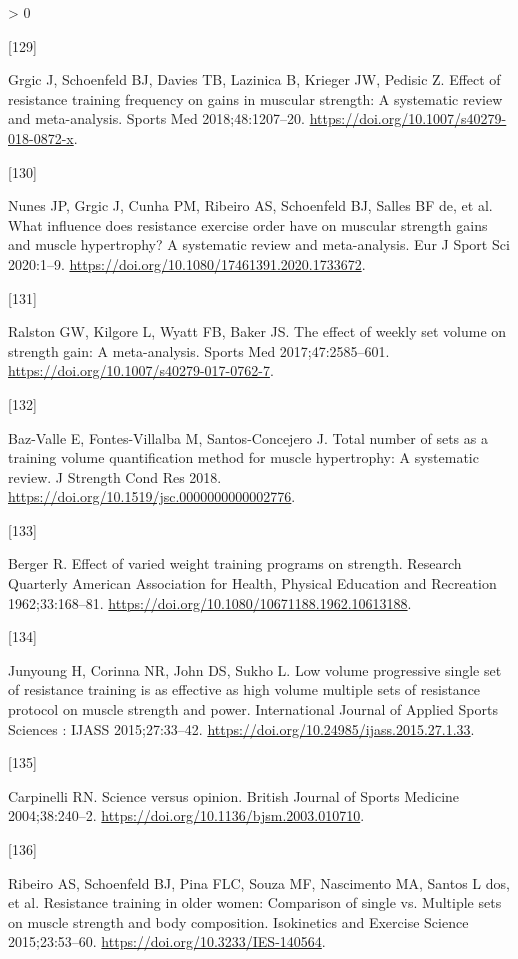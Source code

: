 \documentclass[twoside,10pt]{gihclass} %
\newlength{\cslhangindent}
\newlength{\csllabelwidth}
\newenvironment{CSLReferences}[3] %
 {%
  \setlength{\parindent}{0pt}
  \ifodd #1 \everypar{\setlength{\hangindent}{\cslhangindent}}\ignorespaces\fi
  \ifnum #2 > 0
  \setlength{\parskip}{#2\baselineskip}
  \fi
 }%
 {}
\newcommand{\CSLLeftMargin}[1]{\parbox[t]{\maxof{\widthof{#1}}{\csllabelwidth}}{#1}}
\newcommand{\CSLRightInline}[1]{\parbox[t]{\linewidth}{#1}}
\begin{document}
\begin{CSLReferences}{0}{0}
\leavevmode\hypertarget{ref-RN2570}{}%
\CSLLeftMargin{{[}129{]} }
\CSLRightInline{Grgic J, Schoenfeld BJ, Davies TB, Lazinica B, Krieger JW, Pedisic Z. Effect of resistance training frequency on gains in muscular strength: A systematic review and meta-analysis. Sports Med 2018;48:1207--20. \url{https://doi.org/10.1007/s40279-018-0872-x}.}

\leavevmode\hypertarget{ref-RN2591}{}%
\CSLLeftMargin{{[}130{]} }
\CSLRightInline{Nunes JP, Grgic J, Cunha PM, Ribeiro AS, Schoenfeld BJ, Salles BF de, et al. What influence does resistance exercise order have on muscular strength gains and muscle hypertrophy? A systematic review and meta-analysis. Eur J Sport Sci 2020:1--9. \url{https://doi.org/10.1080/17461391.2020.1733672}.}

\leavevmode\hypertarget{ref-RN2492}{}%
\CSLLeftMargin{{[}131{]} }
\CSLRightInline{Ralston GW, Kilgore L, Wyatt FB, Baker JS. The effect of weekly set volume on strength gain: A meta-analysis. Sports Med 2017;47:2585--601. \url{https://doi.org/10.1007/s40279-017-0762-7}.}

\leavevmode\hypertarget{ref-RN2130}{}%
\CSLLeftMargin{{[}132{]} }
\CSLRightInline{Baz-Valle E, Fontes-Villalba M, Santos-Concejero J. Total number of sets as a training volume quantification method for muscle hypertrophy: A systematic review. J Strength Cond Res 2018. \url{https://doi.org/10.1519/jsc.0000000000002776}.}

\leavevmode\hypertarget{ref-RN1476}{}%
\CSLLeftMargin{{[}133{]} }
\CSLRightInline{Berger R. Effect of varied weight training programs on strength. Research Quarterly American Association for Health, Physical Education and Recreation 1962;33:168--81. \url{https://doi.org/10.1080/10671188.1962.10613188}.}

\leavevmode\hypertarget{ref-RN2568}{}%
\CSLLeftMargin{{[}134{]} }
\CSLRightInline{Junyoung H, Corinna NR, John DS, Sukho L. Low volume progressive single set of resistance training is as effective as high volume multiple sets of resistance protocol on muscle strength and power. International Journal of Applied Sports Sciences : IJASS 2015;27:33--42. \url{https://doi.org/10.24985/ijass.2015.27.1.33}.}

\leavevmode\hypertarget{ref-RN2201}{}%
\CSLLeftMargin{{[}135{]} }
\CSLRightInline{Carpinelli RN. Science versus opinion. British Journal of Sports Medicine 2004;38:240--2. \url{https://doi.org/10.1136/bjsm.2003.010710}.}

\leavevmode\hypertarget{ref-RN2465}{}%
\CSLLeftMargin{{[}136{]} }
\CSLRightInline{Ribeiro AS, Schoenfeld BJ, Pina FLC, Souza MF, Nascimento MA, Santos L dos, et al. Resistance training in older women: Comparison of single vs. Multiple sets on muscle strength and body composition. Isokinetics and Exercise Science 2015;23:53--60. \url{https://doi.org/10.3233/IES-140564}.}


\end{CSLReferences}
\end{document}
